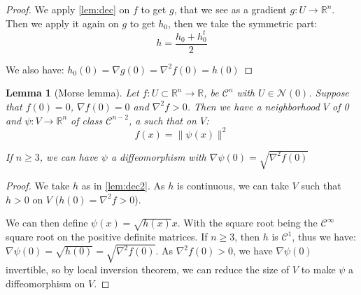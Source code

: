 \documentclass[10pt,a4paper]{report}
\theoremstyle{plain}
\newtheorem{lem}[thm]{Lemma}
\theoremstyle{definition}
\theoremstyle{remark}
\newcommand{\R}{\ensuremath{\mathbb{R}}}
\renewcommand{\geq}{\geqslant}
\newcommand{\class}[1]{{\mathscr{C}^{#1}}}
\begin{document}
\begin{proof}
  We apply \cref{lem:dec} on $f$ to get $g$, that we see as a gradient $g :U \to
  \R^n$. Then we apply it again on $g$ to get $h_0$, then we take the symmetric part:
  \[h = \frac{h_0 + h_0^t}2\]

  We also have: $h_0(0) = \nabla g(0) = \nabla^2 f(0) = h(0)$
\end{proof}


\begin{lem}[Morse lemma]\label{lem:morse}
  Let $f : U \subset \R^n \to \R$, be $\class{n}$ with $U \in \mathcal{N}(0)$.
  Suppose that $f(0) = 0$, $\nabla f(0) = 0$ and $\nabla^2 f > 0$.
  Then we have a neighborhood $V$ of 0 and $\psi : V \to \R^n$ of class
  $\class{n-2}$, a such that on $V$:
  \[f(x) = \|\psi(x)\|^2\]

  If $n \geq 3$, we can have $\psi$ a diffeomorphism with $\nabla \psi(0) = \sqrt{\nabla^2 f(0)}$
\end{lem}

\begin{proof}
  We take $h$ as in \cref{lem:dec2}. As $h$ is continuous, we can take $V$ such
  that $h > 0$ on $V$ ($h(0) = \nabla^2 f > 0$).

  We can then define $\psi(x) = \sqrt{h(x)} x$. With the square root being the
  $\class{\infty}$ square root on the positive definite matrices.
  If $n \geq 3$, then $h$ is $\class 1$, thus we have: $\nabla \psi(0) =
  \sqrt{h(0)} = \sqrt{\nabla^2 f(0)}$. As $\nabla^2
  f(0) > 0$, we have $\nabla \psi(0)$ invertible, so by local inversion theorem,
  we can reduce the size of $V$ to make $\psi$ a diffeomorphism on $V$.

\end{proof}




\end{document}
